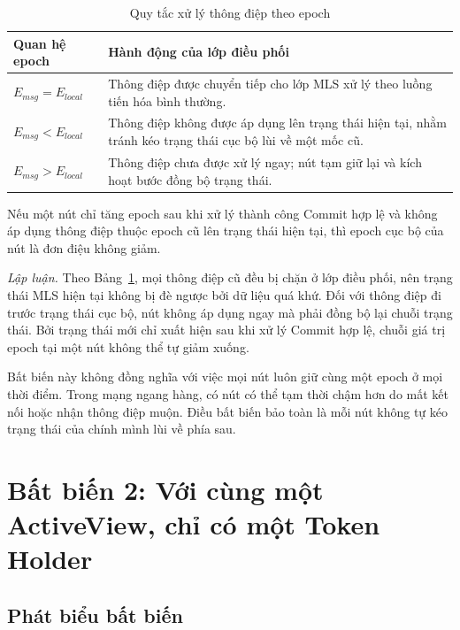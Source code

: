 \documentclass[../DoAn.tex]{subfiles}
\begin{document}
\begin{table}[htbp]
	\centering
	\caption{Quy tắc xử lý thông điệp theo epoch}
	\label{tab:epoch_rules}
	\begin{tabular}{|p{4.5cm}|p{9.5cm}|}
		\hline
		\textbf{Quan hệ epoch} & \textbf{Hành động của lớp điều phối} \\
		\hline
		$E_{msg} = E_{local}$ & Thông điệp được chuyển tiếp cho lớp MLS xử lý theo luồng tiến hóa bình thường. \\
		\hline
		$E_{msg} < E_{local}$ & Thông điệp không được áp dụng lên trạng thái hiện tại, nhằm tránh kéo trạng thái cục bộ lùi về một mốc cũ. \\
		\hline
		$E_{msg} > E_{local}$ & Thông điệp chưa được xử lý ngay; nút tạm giữ lại và kích hoạt bước đồng bộ trạng thái. \\
		\hline
	\end{tabular}
\end{table}

\begin{proposition}
\label{prop:epoch_monotonicity}
Nếu một nút chỉ tăng epoch sau khi xử lý thành công Commit hợp lệ và không áp dụng thông điệp thuộc epoch cũ lên trạng thái hiện tại, thì epoch cục bộ của nút là đơn điệu không giảm.
\end{proposition}

\textit{Lập luận.} Theo Bảng~\ref{tab:epoch_rules}, mọi thông điệp cũ đều bị chặn ở lớp điều phối, nên trạng thái MLS hiện tại không bị đè ngược bởi dữ liệu quá khứ. Đối với thông điệp đi trước trạng thái cục bộ, nút không áp dụng ngay mà phải đồng bộ lại chuỗi trạng thái. Bởi trạng thái mới chỉ xuất hiện sau khi xử lý Commit hợp lệ, chuỗi giá trị epoch tại một nút không thể tự giảm xuống.

Bất biến này không đồng nghĩa với việc mọi nút luôn giữ cùng một epoch ở mọi thời điểm. Trong mạng ngang hàng, có nút có thể tạm thời chậm hơn do mất kết nối hoặc nhận thông điệp muộn. Điều bất biến bảo toàn là mỗi nút không tự kéo trạng thái của chính mình lùi về phía sau.

\section{Bất biến 2: Với cùng một ActiveView, chỉ có một Token Holder}
\label{sec:bat_bien_single_writer}

\subsection{Phát biểu bất biến}
\end{document}
